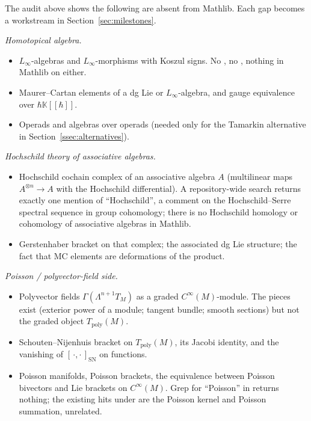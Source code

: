 \documentclass[11pt,a4paper]{article}
\theoremstyle{definition}
\newcommand{\K}{\mathbb{K}}
\newcommand{\Tpoly}{T_{\mathrm{poly}}}
\newcommand{\Cinfty}{C^{\infty}}
\newcommand{\Sch}[2]{[\,#1,#2\,]_{\mathrm{SN}}}
\begin{document}
The audit above shows the following are absent from Mathlib. Each
gap becomes a workstream in Section~\ref{sec:milestones}.

\emph{Homotopical algebra.}
\begin{itemize}[leftmargin=2em]
  \item $L_\infty$-algebras and $L_\infty$-morphisms with Koszul
        signs. No , no ,
        nothing in Mathlib on either.
  \item Maurer--Cartan elements of a dg Lie or $L_\infty$-algebra,
        and gauge equivalence over $\hbar \K[[\hbar]]$.
  \item Operads and algebras over operads (needed only for the
        Tamarkin alternative in Section~\ref{ssec:alternatives}).
\end{itemize}

\emph{Hochschild theory of associative algebras.}
\begin{itemize}[leftmargin=2em]
  \item Hochschild cochain complex of an associative algebra $A$
        (multilinear maps $A^{\otimes n} \to A$ with the Hochschild
        differential). A repository-wide search returns exactly one
        mention of ``Hochschild'', a comment on the Hochschild--Serre
        spectral sequence in group cohomology; there is no Hochschild
        homology or cohomology of associative algebras in Mathlib.
  \item Gerstenhaber bracket on that complex; the associated dg Lie
        structure; the fact that MC elements are deformations of the
        product.
\end{itemize}

\emph{Poisson / polyvector-field side.}
\begin{itemize}[leftmargin=2em]
  \item Polyvector fields $\Gamma(\Lambda^{n+1} T_M)$ as a graded
        $\Cinfty(M)$-module. The pieces exist (exterior power of a
        module; tangent bundle; smooth sections) but not the graded
        object $\Tpoly(M)$.
  \item Schouten--Nijenhuis bracket on $\Tpoly(M)$, its Jacobi
        identity, and the vanishing of $\Sch{\cdot}{\cdot}$ on
        functions.
  \item Poisson manifolds, Poisson brackets, the equivalence
        between Poisson bivectors and Lie brackets on $\Cinfty(M)$.
        Grep for ``Poisson'' in  returns
        nothing; the existing hits under  are the
        Poisson kernel and Poisson summation, unrelated.
\end{itemize}
\end{document}
